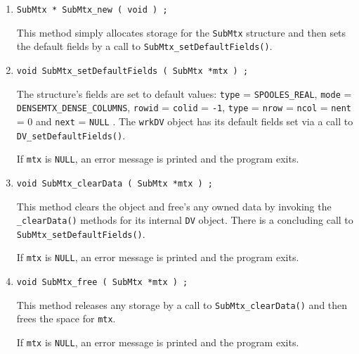 \begin{enumerate}
\item
\begin{verbatim}
SubMtx * SubMtx_new ( void ) ;
\end{verbatim}
This method simply allocates storage for the {\tt SubMtx} structure 
and then sets the default fields by a call to 
{\tt SubMtx\_setDefaultFields()}.
\item
\begin{verbatim}
void SubMtx_setDefaultFields ( SubMtx *mtx ) ;
\end{verbatim}
The structure's fields are set to default values:
{\tt type} = {\tt SPOOLES\_REAL},
{\tt mode} = {\tt DENSEMTX\_DENSE\_COLUMNS},
{\tt rowid} = {\tt colid} = {\tt -1}, 
{\tt type} = {\tt nrow} = {\tt ncol} = {\tt nent} = 0
and {\tt next} = {\tt NULL} .
The {\tt wrkDV} object has its default fields set via a call to
{\tt DV\_setDefaultFields()}.
\par {}
If {\tt mtx} is {\tt NULL},
an error message is printed and the program exits.
\item
\begin{verbatim}
void SubMtx_clearData ( SubMtx *mtx ) ;
\end{verbatim}
This method clears the object and free's any owned data
by invoking the {\tt \_clearData()} methods for its internal
{\tt DV} object.
There is a concluding call to {\tt SubMtx\_setDefaultFields()}.
\par {}
If {\tt mtx} is {\tt NULL},
an error message is printed and the program exits.
\item
\begin{verbatim}
void SubMtx_free ( SubMtx *mtx ) ;
\end{verbatim}
This method releases any storage by a call to 
{\tt SubMtx\_clearData()} and then frees the space for {\tt mtx}.
\par {}
If {\tt mtx} is {\tt NULL},
an error message is printed and the program exits.
\end{enumerate}
\par
